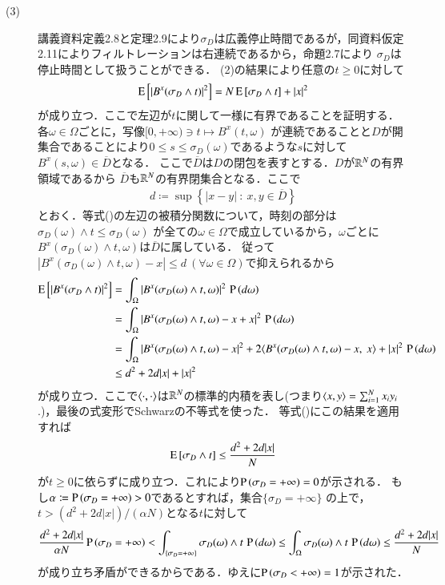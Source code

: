 \begin{prf}
\begin{description}
	\item[(3)] 講義資料定義2.8と定理2.9により$\sigma_D$は広義停止時間であるが，同資料仮定2.11によりフィルトレーションは右連続であるから，命題2.7により
		$\sigma_D$は停止時間として扱うことができる．
		(2)の結果により任意の$t \geq 0$に対して
		\begin{align}
			\operatorname{E} \left[ |B^x(\sigma_D \wedge t)|^2 \right] = N\operatorname{E} \left[ \sigma_D \wedge t \right] + |x|^2 \label{eq:stoc_report_Q2_3}
		\end{align}
		が成り立つ．ここで左辺が$t$に関して一様に有界であることを証明する．各$\omega \in \Omega$ごとに，写像$[0,+\infty) \ni t \longmapsto B^x(t, \omega)$
		が連続であることと$D$が開集合であることにより$0 \leq s \leq \sigma_D(\omega)$であるような$s$に対して$B^x(s, \omega) \in \overline{D}$となる．
		ここで$\overline{D}$は$D$の閉包を表すとする．$D$が$\mathbb{R}^N$の有界領域であるから
		$\overline{D}$も$\mathbb{R}^N$の有界閉集合となる．ここで
		\begin{align}
			d \coloneqq \sup{}{\left\{|x - y|\ :\ x,y \in \overline{D} \right\}}
		\end{align}
		とおく．等式()の左辺の被積分関数について，時刻の部分は$\sigma_D(\omega) \wedge t \leq \sigma_D(\omega)$
		が全ての$\omega \in \Omega$で成立しているから，$\omega$ごとに$B^x(\sigma_D(\omega) \wedge t, \omega)$は$\overline{D}$に属している．
		従って$|B^x(\sigma_D(\omega) \wedge t, \omega) - x| \leq d \ (\forall \omega \in \Omega)$で抑えられるから
		\begin{align}
			\Exp{|B^x(\sigma_D \wedge t)|^2} 
			&= \int_{\Omega} |B^x(\sigma_D(\omega) \wedge t, \omega)|^2\, \prob{d\omega} \\
			&= \int_{\Omega} |B^x(\sigma_D(\omega) \wedge t, \omega) - x + x|^2\, \prob{d\omega} \\
			&= \int_{\Omega} |B^x(\sigma_D(\omega) \wedge t, \omega) - x|^2 + 2\inprod<B^x(\sigma_D(\omega) \wedge t, \omega) - x,\ x> + |x|^2\, \prob{d\omega} \\
			&\leq d^2 + 2d|x| + |x|^2
		\end{align}
		が成り立つ．ここで$\inprod<\cdot, \cdot>$は$\mathbb{R}^N$の標準的内積を表し(つまり$\inprod<x, y> = \sum_{i=1}^{N}x_iy_i$.)，最後の式変形でSchwarzの不等式を使った．
		等式()にこの結果を適用すれば
		\begin{align}
			\operatorname{E} \left[ \sigma_D \wedge t \right] \leq \frac{d^2 + 2d|x|}{N}
		\end{align}
		が$t \geq 0$に依らずに成り立つ．これにより$\operatorname{P} \left(\sigma_D = +\infty\right) = 0$が示される．
		もし$\alpha \coloneqq \operatorname{P} \left(\sigma_D = +\infty\right) > 0$であるとすれば，集合$\{ \sigma_D = +\infty \}$
		の上で，$t > (d^2 + 2d|x|)/(\alpha N)$となる$t$に対して
		\begin{align}
			\frac{d^2 + 2d|x|}{\alpha N} \operatorname{P} \left(\sigma_D = +\infty\right) 
			< \int_{\{\sigma_D = +\infty\}} \sigma_D(\omega) \wedge t\, \operatorname{P} \left(d\omega\right)
			\leq \int_{\Omega} \sigma_D(\omega) \wedge t\, \operatorname{P} \left(d\omega\right)
			\leq \frac{d^2 + 2d|x|}{N}
		\end{align}
		が成り立ち矛盾ができるからである．ゆえに$\operatorname{P} \left(\sigma_D < +\infty\right) = 1$が示された．
		\QED
\end{description}
\end{prf}